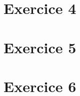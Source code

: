 \documentclass[fontsize=10pt]{article}
\begin{document}
\section*{Exercice 4}
\section*{Exercice 5}
\section*{Exercice 6}
\end{document}
